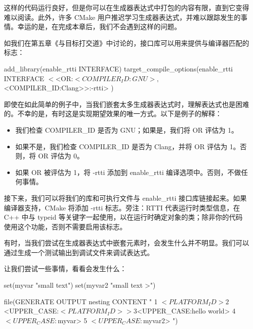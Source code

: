这样的代码运行良好，但是你可以在生成器表达式中打包的内容有限，直到它变得难以阅读。此外，许多 CMake 用户推迟学习生成器表达式，并难以跟踪发生的事情。幸运的是，在完成本章后，我们不会遇到这样的问题。


如我们在第五章《与目标打交道》中讨论的，接口库可以用来提供与编译器匹配的标志：

\begin{cmake}
add_library(enable_rtti INTERFACE)
target_compile_options(enable_rtti INTERFACE
    $<$<OR:$<COMPILER_ID:GNU>,$<COMPILER_ID:Clang>>:-rtti>
)
\end{cmake}

即使在如此简单的例子中，当我们嵌套太多生成器表达式时，理解表达式也是困难的。不幸的是，有时这是实现期望效果的唯一方式。以下是例子的解释：

\begin{itemize}
\item
我们检查 COMPILER\_ID 是否为 GNU；如果是，我们将 OR 评估为 1。

\item
如果不是，我们检查 COMPILER\_ID 是否为 Clang，并将 OR 评估为 1。否则，将 OR 评估为 0。

\item
如果 OR 被评估为 1，将 -rtti 添加到 enable\_rtti 编译选项中。否则，不做任何事情。
\end{itemize}

接下来，我们可以将我们的库和可执行文件与 enable\_rtti 接口库链接起来。如果编译器支持，CMake 将添加 -rtti 标志。旁注：RTTI 代表运行时类型信息，在 C++ 中与 typeid 等关键字一起使用，以在运行时确定对象的类；除非你的代码使用这个功能，否则不需要启用该标志。


有时，当我们尝试在生成器表达式中嵌套元素时，会发生什么并不明显。我们可以通过生成一个测试输出到调试文件来调试表达式。

让我们尝试一些事情，看看会发生什么：


\begin{cmake}
set(myvar "small text")
set(myvar2 "small text >")

file(GENERATE OUTPUT nesting CONTENT "
    1 $<PLATFORM_ID>
    2 $<UPPER_CASE:$<PLATFORM_ID>>
    3 $<UPPER_CASE:hello world>
    4 $<UPPER_CASE:${myvar}>
    5 $<UPPER_CASE:${myvar2}>
")
\end{cmake}

